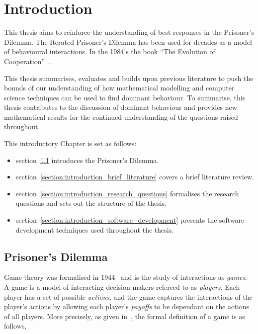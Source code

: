 \chapter{Introduction}\label{chapter:introduction}

This thesis aims to reinforce the understanding of best responses in the
Prisoner's Dilemma. The Iterated Prisoner’s Dilemma has been used for decades as
a model of behavioural interactions. In the 1984's the book ``The Evolution of
Cooperation'' ... %

This thesis summarises, evaluates and builds upon previous literature to push
the bounds of our understanding of how mathematical modelling and computer
science techniques can be used to find dominant behaviour. To summarise,
this thesis contributes to the discussion of dominant behaviour and provides new
mathematical results for the continued understanding of the questions raised
throughout.

This introductory Chapter is set as follows:

\begin{itemize}
    \item section~\ref{section:introduction_prisoners_dilemma} introduces
    the Prisoner's Dilemma.
    \item section~\ref{section:introduction_brief_literature} covers a brief
    literature review.
    \item section~\ref{section:introduction_research_questions} formalises the research
    questions and sets out the structure of the thesis.
    \item section~\ref{section:introduction_software_development} presents the
    software development techniques used throughout the thesis.
\end{itemize}

\section{Prisoner's Dilemma}\label{section:introduction_prisoners_dilemma}

Game theory was formalised in 1944~\cite{VonNeumann1944} and is the study of
interactions as \textit{games}. A game is a model of interacting
decision makers refereed to as \textit{players}. Each player has a set of
possible \textit{actions}, and the game captures the interactions of the player's
actions by allowing each player's \textit{payoffs} to be dependant on the actions
of all players. More precisely, as given in~\cite{Osborne2004}, the formal
definition of a game is as follows,

